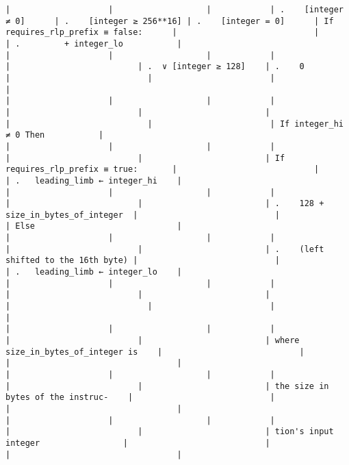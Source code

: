 \documentclass[varwidth=\maxdimen,margin=0.5cm,multi={verbatim}]{standalone}
\begin{document}
\begin{verbatim}
|                    |                   |            | .    [integer ≠ 0]      | .    [integer ≥ 256**16] | .    [integer = 0]      | If requires_rlp_prefix ≡ false:      |                            |                        | .         + integer_lo           |
|                    |                   |            |                         |                          | .  ∨ [integer ≥ 128]    | .    0                               |                            |                        |                                  |
|                    |                   |            |                         |                          |                         |                                      |                            |                        | If integer_hi ≠ 0 Then           |
|                    |                   |            |                         |                          |                         | If requires_rlp_prefix ≡ true:       |                            |                        | .   leading_limb ← integer_hi    |
|                    |                   |            |                         |                          |                         | .    128 + size_in_bytes_of_integer  |                            |                        | Else                             |
|                    |                   |            |                         |                          |                         | .    (left shifted to the 16th byte) |                            |                        | .   leading_limb ← integer_lo    |
|                    |                   |            |                         |                          |                         |                                      |                            |                        |                                  |
|                    |                   |            |                         |                          |                         | where size_in_bytes_of_integer is    |                            |                        |                                  |
|                    |                   |            |                         |                          |                         | the size in bytes of the instruc-    |                            |                        |                                  |
|                    |                   |            |                         |                          |                         | tion's input integer                 |                            |                        |                                  |

\end{verbatim}
\end{document}
